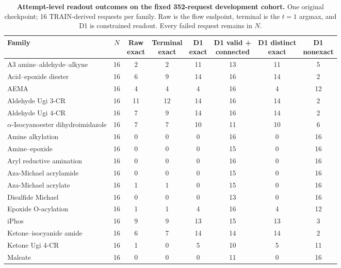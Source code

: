 \begin{table}[H]
\caption{\textbf{Attempt-level readout outcomes on the fixed 352-request development cohort.} One original checkpoint; 16 TRAIN-derived requests per family. Raw is the flow endpoint, terminal is the $t=1$ argmax, and D1 is constrained readout. Every failed request remains in $N$.}
\label{tab:22-outcomes}
\centering\footnotesize\setlength{\tabcolsep}{3pt}\renewcommand{\arraystretch}{1.10}
\begin{tabular}{@{}>{\raggedright\arraybackslash}p{}ccccccc@{}}
\toprule
Family & $N$ & \shortstack{Raw\\exact} & \shortstack{Terminal\\exact} & \shortstack{D1\\exact} & \shortstack{D1 valid +\\connected} & \shortstack{D1 distinct\\exact} & \shortstack{D1\\nonexact} \\
\midrule
A3 amine--aldehyde--alkyne & 16 & 2 & 2 & 11 & 13 & 11 & 5 \\
Acid--epoxide diester & 16 & 6 & 9 & 14 & 16 & 14 & 2 \\
AEMA & 16 & 4 & 4 & 4 & 16 & 4 & 12 \\
Aldehyde Ugi 3-CR & 16 & 11 & 12 & 14 & 16 & 14 & 2 \\
Aldehyde Ugi 4-CR & 16 & 7 & 9 & 14 & 16 & 14 & 2 \\
$\alpha$-Isocyanoester dihydroimidazole & 16 & 7 & 7 & 10 & 11 & 10 & 6 \\
Amine alkylation & 16 & 0 & 0 & 0 & 16 & 0 & 16 \\
Amine--epoxide & 16 & 0 & 0 & 0 & 15 & 0 & 16 \\
Aryl reductive amination & 16 & 0 & 0 & 0 & 16 & 0 & 16 \\
Aza-Michael acrylamide & 16 & 0 & 0 & 0 & 15 & 0 & 16 \\
Aza-Michael acrylate & 16 & 1 & 1 & 0 & 15 & 0 & 16 \\
Disulfide Michael & 16 & 0 & 0 & 0 & 13 & 0 & 16 \\
Epoxide O-acylation & 16 & 1 & 1 & 4 & 16 & 4 & 12 \\
iPhos & 16 & 9 & 9 & 13 & 15 & 13 & 3 \\
Ketone--isocyanide amide & 16 & 6 & 7 & 14 & 14 & 14 & 2 \\
Ketone Ugi 4-CR & 16 & 1 & 0 & 5 & 10 & 5 & 11 \\
Maleate & 16 & 0 & 0 & 0 & 11 & 0 & 16 \\

\end{tabular}
\end{table}
